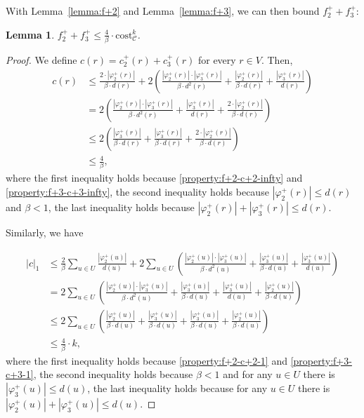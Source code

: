 \documentclass[11pt]{article}
\newcommand{\cost}{\mathrm{cost}}
\newtheorem{lemma}[theorem]{Lemma}
\newcommand{\calC}{{\mathcal{C}}}
\begin{document}
\begin{CJK*}{UTF8}{gbsn}
With Lemma~\ref{lemma:f+2} and Lemma~\ref{lemma:f+3}, we can then bound $f^+_2 + f^+_3$: 
\begin{lemma}
    $f^+_2 + f^+_3 \leq \frac4\beta \cdot \cost^k_\calC$. 
\end{lemma}
\begin{proof}
    We define $c(r) = c^+_2(r) + c^+_3(r)$ for every $r \in V$. Then,
{\begin{align*}
            c(r) &\leq \frac{2\cdot|\varphi^+_2(r)|}{\beta\cdot d(r)} + 2\left(\frac{|\varphi^+_2(r)|\cdot |\varphi^+_3(r)|}{\beta\cdot d^2(r)}  + \frac{|\varphi^+_2(r)|}{\beta\cdot d(r)} + \frac{|\varphi^+_3(r)|}{d(r)}\right)\\
            &= 2\left(\frac{|\varphi^+_2(r)|\cdot |\varphi^+_3(r)|}{\beta\cdot d^2(r)} + \frac{|\varphi^+_3(r)|}{d(r)} + \frac{2\cdot |\varphi^+_2(r)|}{\beta\cdot d(r)}\right)\\
            &\leq 2\left(\frac{|\varphi^+_3(r)|}{\beta\cdot d(r)} + \frac{|\varphi^+_3(r)|}{\beta \cdot d(r)} + \frac{2\cdot |\varphi^+_2(r)|}{\beta\cdot d(r)}\right)\\
            &\leq \frac{4}{\beta},
        \end{align*}
        where the first inequality holds because \ref{property:f+2-c+2-infty} and \ref{property:f+3-c+3-infty}, the second inequality holds because $|\varphi^+_2(r)| \leq d(r)$ and $\beta < 1$, the last inequality holds because $|\varphi^+_2(r)| + |\varphi^+_3(r)| \leq d(r)$.
    }

    
    Similarly, we have



\begin{align*}
            |c|_1 &\leq \frac2\beta\sum_{u \in U}\frac{|\varphi^+_2(u)|}{d(u)} + 2 \sum_{u \in U} \left(\frac{|\varphi^+_2(u)|\cdot|\varphi^+_3(u)|}{\beta \cdot d^2(u)} + \frac{|\varphi^+_3(u)|}{\beta \cdot d(u)} + \frac{|\varphi^+_3(u)|}{d(u)}\right) \\
            &= 2\sum_{u \in U} \left(\frac{|\varphi^+_2(u)|\cdot|\varphi^+_3(u)|}{\beta \cdot d^2(u)} + \frac{|\varphi^+_3(u)|}{\beta \cdot d(u)} + \frac{|\varphi^+_3(u)|}{d(u)} + \frac{|\varphi^+_2(u)|}{\beta \cdot d(u)}\right)\\
            &\leq 2\sum_{u \in U} \left(\frac{|\varphi^+_2(u)|}{\beta \cdot d(u)} + \frac{|\varphi^+_3(u)|}{\beta \cdot d(u)} + \frac{|\varphi^+_3(u)|}{\beta \cdot d(u)} + \frac{|\varphi^+_2(u)|}{\beta \cdot d(u)}\right)\\
            &\leq \frac{4}{\beta} \cdot k,
        \end{align*}
        where the first inequality holds because \ref{property:f+2-c+2-1} and \ref{property:f+3-c+3-1}, the second inequality holds because $\beta < 1$ and for any $u \in U$ there is $|\varphi^+_3(u)| \leq d(u)$, the last inequality holds because  for any $u \in U$ there is $|\varphi^+_2(u)| + |\varphi^+_3(u)| \leq d(u)$.



\end{proof}
\end{CJK*}
\end{document}
